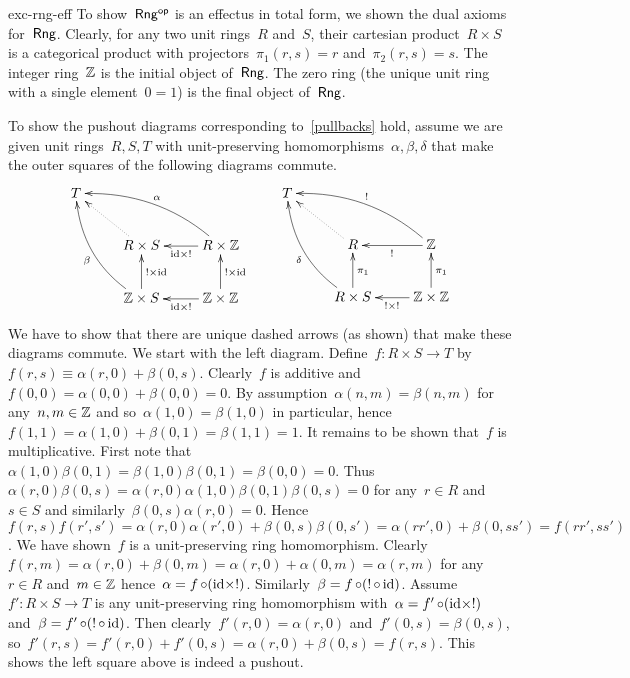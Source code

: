 \begin{solution}{exc-rng-eff}%
   To show~${\mathsf{Rng}}{^{\mathsf{op}}}$ is an effectus in total form,
        we shown the dual axioms for~$\mathsf{Rng}$.
    Clearly, for any two unit rings~$R$ and~$S$,
        their cartesian product~$R \times S$ is a categorical product
        with projectors~$\pi_1(r,s) = r$ and~$\pi_2(r,s)=s$.
    The integer ring~$\mathbb{Z}$ is the initial object of~$\mathsf{Rng}$.
The zero ring (the unique unit ring with a single element~$0=1$)
    is the final object of~$\mathsf{Rng}$.

To show the pushout diagrams corresponding to~\eqref{pullbacks} hold,
    assume we are given unit rings~$R,S,T$ with
    unit-preserving homomorphisms~$\alpha, \beta,\delta$
    that make the outer squares of the following diagrams commute.
\begin{equation*}
    \xymatrix{
    T\\
    & R \times S \ar@{.>}[lu]
    & R \times \Z \ar[l]^{\id\times !}
    \ar@/_1pc/[llu]_{\alpha}
    \\& \Z \times S \ar[u]_{! \times \id}
    \ar@/^1pc/[luu]^{\beta}
    & \Z \times \Z \ar[l]^{\id\times!} \ar[u]_{! \times \id}
    } \qquad
    \xymatrix{
    T\\
    & R \ar@{.>}[lu]
    & \Z \ar[l]^{!}
    \ar@/_1pc/[llu]_{!}
    \\& R \times S \ar[u]_{\pi_1}
    \ar@/^1pc/[luu]^{\delta}
    & \Z \times \Z \ar[l]^{!\times!} \ar[u]_{\pi_1}
    }
\end{equation*}
    We have to show that there are unique dashed arrows (as shown)
        that make these diagrams commute.
    We start with the left diagram.
    Define~$f\colon R\times S \to T$
    by~$f(r,s) \equiv \alpha(r,0) + \beta(0,s)$.
Clearly~$f$ is additive and $f(0,0) = \alpha(0,0) + \beta(0,0) = 0$.
    By assumption~$\alpha(n,m) = \beta(n,m)$ for any~$n,m \in \mathbb{Z}$
        and so~$\alpha(1,0) = \beta(1,0)$ in particular,
        hence~$f(1,1) = \alpha(1,0) + \beta(0,1) = \beta(1,1) = 1$.
It remains to be shown that~$f$ is multiplicative.
    First note that~$\alpha(1,0) \beta(0,1)
    = \beta(1,0)\beta(0,1) = \beta(0,0) = 0$.
    Thus~$\alpha(r,0)\beta(0,s)
            = \alpha(r,0)\alpha(1,0)\beta(0,1)\beta(0,s) = 0$
        for any~$r \in R$ and~$s \in S$
            and similarly~$\beta(0,s)\alpha(r,0) = 0$.
Hence~$f(r,s)f(r',s') = \alpha(r,0)\alpha(r',0) + \beta(0,s)\beta(0,s')
        = \alpha(rr',0) + \beta(0,ss') = f(rr', ss')$.
        We have shown~$f$ is a unit-preserving ring homomorphism.
Clearly~$f(r, m) = \alpha(r, 0) + \beta(0, m)
            = \alpha(r,0) + \alpha(0,m) = \alpha(r,m)$
                for any~$r \in R$ and~$m \in \mathbb{Z}$
                hence~$\alpha = f \mathop{\circ} (\mathrm{id} \times !)$.
    Similarly~$\beta = f \mathop{\circ} (! \mathop{\circ} \mathrm{id})$.
Assume~$f'\colon R\times S \to T$ is any unit-preserving
    ring homomorphism with~$\alpha = f' \mathop{\circ} (\mathrm{id} \times !)$
        and~$\beta = f' \mathop{\circ} (! \mathop{\circ} \mathrm{id})$.
Then clearly~$f'(r,0) = \alpha(r,0)$ and~$f'(0,s) = \beta(0,s)$,
    so~$f'(r,s) = f'(r,0) + f'(0,s) = \alpha(r,0) + \beta(0,s) = f(r,s)$.
This shows the left square above is indeed a pushout.


\end{solution}
